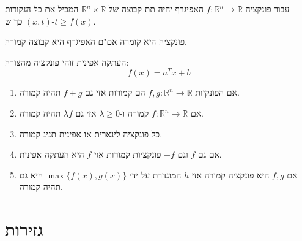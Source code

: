 \documentclass{tstextbook}
\begin{document}
\begin{definition}[אפיגרף]
עבור פונקציה \(f:\mathbb{R}^{n}\to \mathbb{R}\) האפיגרף יהיה תת קבוצה של \(\mathbb{R}^{n}\times \mathbb{R}\) המכיל את כל הנקודות \((x,t)\) כך ש-\(t\geq f(x)\).

\end{definition}
\begin{proposition}
פונקציה היא קומרה אם"ם האפיגרף היא קבוצה קמורה.

\end{proposition}
\begin{reminder}
העתקה אפינית זוהי פונקציה מהצורה:
$$f(x)=a^{T}x+b$$

\end{reminder}
\begin{proposition}
  \begin{enumerate}
    \item אם הפונקיות \(f,g:\mathbb{R}^{n}\to \mathbb{R}\) הם קמורות אזי גם \(f+g\) תהיה קמורה. 


    \item אם \(f:\mathbb{R}^{n}\to \mathbb{R}\) קמורה ו-\(\lambda \geq 0\) אזי גם \(\lambda f\) תהיה קמורה. 


    \item כל פונקציה לינארית או אפינית תנינ קמורה. 


    \item אם גם \(f\) וגם \(-f\) פונקציות קמורות אזי \(f\) היא העתקה אפינית. 


    \item אם \(f,g\) היא פונקציה קמורה אזי \(h\) המוגדרת על ידי \(\max\{ f(x),g(x) \}\) היא גם תהיה קמורה. 


  \end{enumerate}
\end{proposition}
\section{גזירות}
\end{document}

